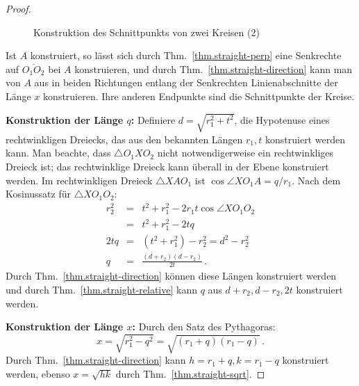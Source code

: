 \begin{proof}
\begin{figure}[b]
\begin{center}
\end{center}
\caption{Konstruktion des Schnittpunkts von zwei Kreisen (2)}\label{f.se-circle-circle2}
\end{figure}

Ist $A$ konstruiert, so lässt sich durch Thm.~\ref{thm.straight-perp} eine Senkrechte auf $\overline{O_1O_2}$ bei $A$ konstruieren, und durch Thm.~\ref{thm.straight-direction} kann man von $A$ aus in beiden Richtungen entlang der Senkrechten Linienabschnitte der Länge $x$ konstruieren. Ihre anderen Endpunkte sind die Schnittpunkte der Kreise.

\noindent\textbf{Konstruktion der Länge $q$:} Definiere $d=\sqrt{r_1^2+t^2}$, die Hypotenuse eines rechtwinkligen Dreiecks, das aus den bekannten Längen $r_1,t$ konstruiert werden kann. Man beachte, dass $\triangle O_1XO_2$ nicht notwendigerweise ein rechtwinkliges Dreieck ist; das rechtwinklige Dreieck kann überall in der Ebene konstruiert werden. Im rechtwinkligen Dreieck $\triangle XAO_1$ ist $\cos\angle XO_1A=q/r_1$. Nach dem Kosinussatz  für $\triangle XO_1O_2$:
\begin{eqnarray*}
r_2^2 &=& t^2 + r_1^2 - 2r_1t\cos\angle XO_1O_2\\
&=& t^2 + r_1^2 - 2tq\\
2tq &=& (t^2+r_1^2) - r_2^2=d^2-r_2^2\\
q&=&\frac{(d+r_2)(d-r_2)}{2t}\,.
\end{eqnarray*}
Durch Thm.~\ref{thm.straight-direction} können diese Längen konstruiert werden und durch Thm.~\ref{thm.straight-relative} kann $q$ aus $d+r_2,d-r_2,2t$ konstruiert werden.

\medskip

\noindent\textbf{Konstruktion der Länge $x$:} Durch den Satz des Pythagoras:
\[
x=\sqrt{r_1^2-q^2}=\sqrt{(r_1+q)(r_1-q)}\,.
\]
Durch Thm.~\ref{thm.straight-direction} kann $h =r_1+ q,k= r_1 - q$ konstruiert werden, ebenso $x=\sqrt{hk}$ durch Thm.~\ref{thm.straight-sqrt}.
\end{proof}

